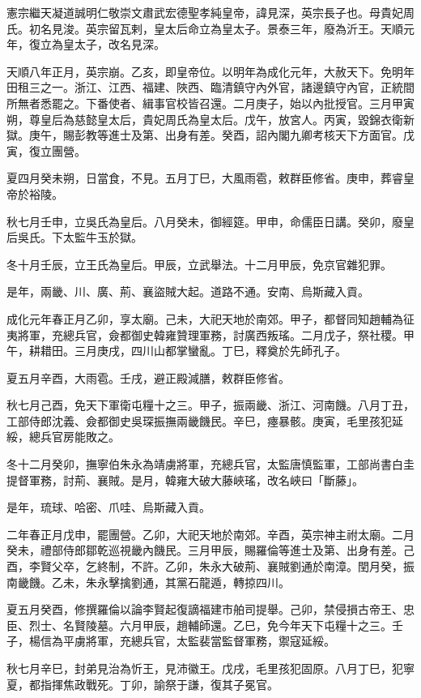 
\begin{pinyinscope}
憲宗繼天凝道誠明仁敬崇文肅武宏德聖孝純皇帝，諱見深，英宗長子也。母貴妃周氏。初名見浚。英宗留瓦剌，皇太后命立為皇太子。景泰三年，廢為沂王。天順元年，復立為皇太子，改名見深。

天順八年正月，英宗崩。乙亥，即皇帝位。以明年為成化元年，大赦天下。免明年田租三之一。浙江、江西、福建、陜西、臨清鎮守內外官，諸邊鎮守內官，正統間所無者悉罷之。下番使者、緝事官校皆召還。二月庚子，始以內批授官。三月甲寅朔，尊皇后為慈懿皇太后，貴妃周氏為皇太后。戊午，放宮人。丙寅，毀錦衣衛新獄。庚午，賜彭教等進士及第、出身有差。癸酉，詔內閣九卿考核天下方面官。戊寅，復立團營。

夏四月癸未朔，日當食，不見。五月丁巳，大風雨雹，敕群臣修省。庚申，葬睿皇帝於裕陵。

秋七月壬申，立吳氏為皇后。八月癸未，御經筵。甲申，命儒臣日講。癸卯，廢皇后吳氏。下太監牛玉於獄。

冬十月壬辰，立王氏為皇后。甲辰，立武舉法。十二月甲辰，免京官雜犯罪。

是年，兩畿、川、廣、荊、襄盜賊大起。道路不通。安南、烏斯藏入貢。

成化元年春正月乙卯，享太廟。己未，大祀天地於南郊。甲子，都督同知趙輔為征夷將軍，充總兵官，僉都御史韓雍贊理軍務，討廣西叛瑤。二月戊子，祭社稷。甲午，耕耤田。三月庚戌，四川山都掌蠻亂。丁巳，釋奠於先師孔子。

夏五月辛酉，大雨雹。壬戌，避正殿減膳，敕群臣修省。

秋七月己酉，免天下軍衛屯糧十之三。甲子，振兩畿、浙江、河南饑。八月丁丑，工部侍郎沈義、僉都御史吳琛振撫兩畿饑民。辛巳，瘞暴骸。庚寅，毛里孩犯延綏，總兵官房能敗之。

冬十二月癸卯，撫寧伯朱永為靖虜將軍，充總兵官，太監唐慎監軍，工部尚書白圭提督軍務，討荊、襄賊。是月，韓雍大破大藤峽瑤，改名峽曰「斷藤」。

是年，琉球、哈密、爪哇、烏斯藏入貢。

二年春正月戊申，罷團營。乙卯，大祀天地於南郊。辛酉，英宗神主祔太廟。二月癸未，禮部侍郎鄒乾巡視畿內饑民。三月甲辰，賜羅倫等進士及第、出身有差。己酉，李賢父卒，乞終制，不許。乙卯，朱永大破荊、襄賊劉通於南漳。閏月癸，振南畿饑。乙未，朱永擊擒劉通，其黨石龍遁，轉掠四川。

夏五月癸酉，修撰羅倫以論李賢起復謫福建市舶司提舉。己卯，禁侵損古帝王、忠臣、烈士、名賢陵墓。六月甲辰，趙輔師還。乙巳，免今年天下屯糧十之三。壬子，楊信為平虜將軍，充總兵官，太監裴當監督軍務，禦寇延綏。

秋七月辛巳，封弟見治為忻王，見沛徽王。戊戌，毛里孩犯固原。八月丁巳，犯寧夏，都指揮焦政戰死。丁卯，諭祭于謙，復其子冕官。


\end{pinyinscope}
